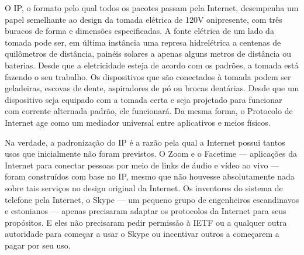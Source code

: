 O IP, o formato pelo qual todos os pacotes passam pela Internet, desempenha um papel
semelhante ao design da tomada elétrica de 120V onipresente, com três buracos de forma e
dimensões especificadas. A fonte elétrica de um lado da tomada pode ser, em última instância
uma represa hidrelétrica a centenas de quilômetros de distância, painéis solares a apenas
alguns metros de distância ou baterias. Desde que a eletricidade esteja de acordo com os
padrões, a tomada está fazendo o seu trabalho. Os dispositivos que são conectados à tomada
podem ser geladeiras, escovas de dente, aspiradores de pó ou brocas dentárias. Desde que um
dispositivo seja equipado com a tomada certa e seja projetado para funcionar com corrente
alternada padrão, ele funcionará. Da mesma forma, o Protocolo de Internet age como um mediador
universal entre aplicativos e meios físicos.

Na verdade, a padronização do IP é a razão pela qual a Internet possui tantos usos que
inicialmente não foram previstos. O Zoom e o Facetime --- aplicações da Internet para
conectar pessoas por meio de links de áudio e vídeo ao vivo --- foram construídos com base
no IP, mesmo que não houvesse absolutamente nada sobre tais serviços no design original da
Internet. Os inventores do sistema de telefone pela Internet, o Skype --- um pequeno grupo de
engenheiros escandinavos e estonianos --- apenas precisaram adaptar os protocolos da Internet
para seus propósitos. E eles não precisaram pedir permissão à IETF ou a qualquer outra
autoridade para começar a usar o Skype ou incentivar outros a começarem a pagar por seu uso.